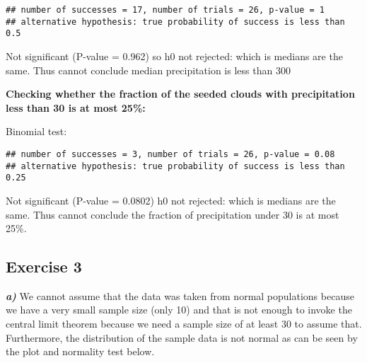 \documentclass[
]{article}
\newenvironment{Shaded}{\begin{snugshade}}{\end{snugshade}}
\newcommand{\AttributeTok}[1]{\textcolor[rgb]{0.77,0.63,0.00}{#1}}
\newcommand{\DecValTok}[1]{\textcolor[rgb]{0.00,0.00,0.81}{#1}}
\newcommand{\FloatTok}[1]{\textcolor[rgb]{0.00,0.00,0.81}{#1}}
\newcommand{\FunctionTok}[1]{\textcolor[rgb]{0.00,0.00,0.00}{#1}}
\newcommand{\NormalTok}[1]{#1}
\newcommand{\OtherTok}[1]{\textcolor[rgb]{0.56,0.35,0.01}{#1}}
\newcommand{\SpecialCharTok}[1]{\textcolor[rgb]{0.00,0.00,0.00}{#1}}
\newcommand{\StringTok}[1]{\textcolor[rgb]{0.31,0.60,0.02}{#1}}
\begin{document}
\begin{verbatim}
## number of successes = 17, number of trials = 26, p-value = 1
## alternative hypothesis: true probability of success is less than 0.5
\end{verbatim}

Not significant (P-value = 0.962) so h0 not rejected: which is medians
are the same. Thus cannot conclude median precipitation is less than 300

\textbf{Checking whether the fraction of the seeded clouds with
precipitation less than 30 is at most 25\%:}

Binomial test:

\begin{Shaded}
\end{Shaded}

\begin{verbatim}
## number of successes = 3, number of trials = 26, p-value = 0.08
## alternative hypothesis: true probability of success is less than 0.25
\end{verbatim}

Not significant (P-value = 0.0802) h0 not rejected: which is medians are
the same. Thus cannot conclude the fraction of precipitation under 30 is
at most 25\%.

\hypertarget{exercise-3}{%
\subsection{Exercise 3}\label{exercise-3}}

\textbf{\emph{a)}} We cannot assume that the data was taken from normal
populations because we have a very small sample size (only 10) and that
is not enough to invoke the central limit theorem because we need a
sample size of at least 30 to assume that. Furthermore, the distribution
of the sample data is not normal as can be seen by the plot and
normality test below.

\begin{Shaded}
\end{Shaded}
\end{document}
